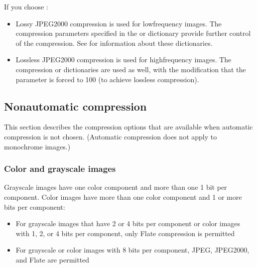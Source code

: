 \documentclass[letterpaper,12pt,english,openany,oneside]{sphinxmanual}
\begin{document}
If you choose  :
\begin{itemize}
\item {} 
Lossy JPEG2000 compression is used for low\sphinxhyphen{}frequency images. The compression parameters specified in the  or  dictionary provide further control of the compression. See  for information about these dictionaries.

\item {} 
Lossless JPEG2000 compression is used for high\sphinxhyphen{}frequency images. The compression  or  dictionaries are used as well, with the modification that the  parameter is forced to 100 (to achieve lossless compression).

\end{itemize}


\subsection{Non\sphinxhyphen{}automatic compression}
\label{\detokenize{PDF_Create_UsingSettings:non-automatic-compression}}
This section describes the compression options that are available when automatic compression is not chosen. (Automatic compression does not apply to monochrome images.)


\subsubsection{Color and grayscale images}
\label{\detokenize{PDF_Create_UsingSettings:color-and-grayscale-images}}
Grayscale images have one color component and more than one 1 bit per component. Color images have more than one color component and 1 or more bits per component:
\begin{itemize}
\item {} 
For grayscale images that have 2 or 4 bits per component or color images with 1, 2, or 4 bits per component, only Flate compression is permitted

\item {} 
For grayscale or color images with 8 bits per component, JPEG, JPEG2000, and Flate are permitted

\end{itemize}
\end{document}
